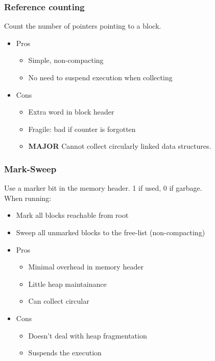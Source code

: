 \documentclass[a4paper]{article}
\begin{document}
\subsubsection{Reference counting}
Count the number of pointers pointing to a block.
\begin{itemize}
    \item Pros
        \begin{itemize}
            \item Simple, non-compacting
            \item No need to suspend execution when collecting
        \end{itemize}
    \item Cons
        \begin{itemize}
            \item Extra word in block header
            \item Fragile: bad if counter is forgotten
            \item \textbf{MAJOR} Cannot collect circularly linked data structures.
        \end{itemize}
\end{itemize}
\subsubsection{Mark-Sweep}
Use a marker bit in the memory header. 1 if used, 0 if garbage.
\\When running:
\begin{itemize}
    \item Mark all blocks reachable from root
    \item Sweep all unmarked blocks to the free-list (non-compacting)
\end{itemize}
\begin{itemize}
    \item Pros
        \begin{itemize}
            \item Minimal overhead in memory header
            \item Little heap maintainance
            \item Can collect circular
        \end{itemize}
    \item Cons
        \begin{itemize}
            \item Doesn't deal with heap fragmentation
            \item Suspends the execution
        \end{itemize}
\end{itemize}
\end{document}
